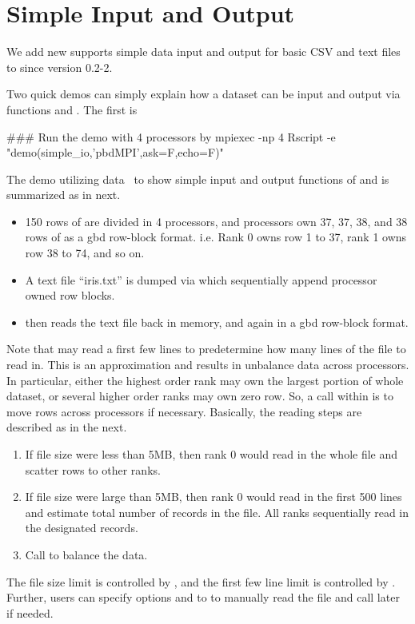 
\section[Simple Input and Output]{Simple Input and Output}
\label{sec:simple_io}

We add new supports simple data input and output for basic CSV and text
files to  since version 0.2-2.

Two quick demos can simply explain how a dataset can be input and output
via  functions  and
. The first is
\begin{Command}
### Run the demo with 4 processors by
mpiexec -np 4 Rscript -e "demo(simple_io,'pbdMPI',ask=F,echo=F)"
\end{Command}
The demo utilizing  data~\citep{Fisher1936} to show simple input
and output functions of  and is summarized as in next.
\begin{itemize}
\item 150 rows of  are divided in 4 processors, and processors
      own 37, 37, 38, and 38 rows of  as a gbd row-block format.
      i.e. Rank 0 owns row 1 to 37, rank 1 owns row 38 to 74, and so on.
\item A text file ``iris.txt'' is dumped via  which
      sequentially append processor owned row blocks.
\item {} then reads the text file back in memory, and
      again in a gbd row-block format.
\end{itemize}

Note that  may read a first few lines to predetermine
how many lines of the file to read in. This is an approximation and results
in unbalance data across processors. In particular, either the highest order
rank may own the largest portion of whole dataset, or several higher order
ranks may own zero row. So, a call
 within 
is to move rows across processors if necessary.
Basically, the reading steps are described as in the next.
\begin{enumerate}
\item If file size were less than 5MB, then rank 0 would read in the whole file
      and scatter rows to other ranks.
\item If file size were large than 5MB, then rank 0 would read in the first
      500 lines and estimate total number of records in the file. All ranks
      sequentially read in the designated records.    
\item Call  to balance the data.
\end{enumerate}
The file size limit is controlled by , and
the first few line limit is controlled by .
Further, users can specify options  and  to
 to manually read the file and call
 later if needed.

